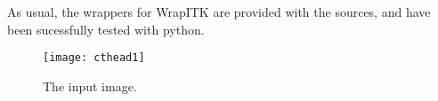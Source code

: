 \documentclass{InsightArticle}
\begin{document}
As usual, the wrappers for WrapITK are provided with the sources, and have been sucessfully
tested with python.









\begin{figure}[htbp]
\centering
\texttt{[image: cthead1]}
\caption{The input image.\label{cthead1}}
\end{figure}


\appendix





\nocite{ITKSoftwareGuide}
\end{document}
